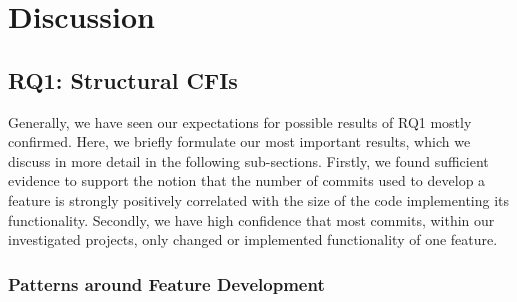 \clearpage 

\section{Discussion}\label{sec:discussion}

\subsection*{\textbf{RQ1: Structural CFIs}}\label{sec:disc_struc_cfis}

Generally, we have seen our expectations for possible results of RQ1 mostly confirmed.
Here, we briefly formulate our most important results, which we discuss in more detail in the following sub-sections.
Firstly, we found sufficient evidence to support the notion that the number of commits used to develop a feature is strongly positively correlated with the size of the code implementing its functionality. 
Secondly, we have high confidence that most commits, within our investigated projects, only changed or implemented functionality of one feature.

\subsubsection*{Patterns around Feature Development}

